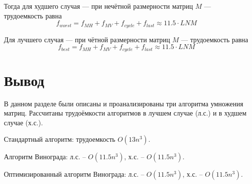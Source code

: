 Тогда для худшего случая --- при нечётной размерности матриц $M$ --- трудоемкость равна
\begin{equation}
	\label{for:bad_impr}
	f_{worst} = f_{MH} + f_{MV} + f_{cycle} + f_{last} \approx 11.5 \cdot LNM
\end{equation}

Для лучшего случая --- при чётной размерности матриц $M$ --- трудоемкость равна 
\begin{equation}
	\label{for:good_impr}
	f_{best} = f_{MH} + f_{MV} + f_{cycle} + f_{last} \approx 11.5 \cdot LNM
\end{equation}


\section*{Вывод}
В данном разделе были описаны и проанализированы три алгоритма умножения матриц. Рассчитаны трудоёмкости алгоритмов в лучшем случае (л.с.) и в худшем случае (х.с.).

Стандартный алгоритм: трудоемкость $O(13n^{3})$.

Алгоритм Винограда: л.с. -- $O(11.5n^{3})$,  х.с. --  $O(11.5n^{3})$.

Оптимизированный алгоритм Винограда: л.с. -- $O(11.5n^{3})$,  х.с. -- $O(11.5n^{3})$.